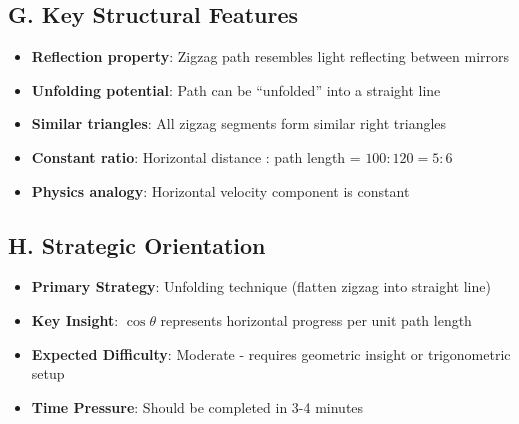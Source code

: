 \documentclass[11pt]{article}
\begin{document}
\begin{problembox}
\subsection*{G. Key Structural Features}
\begin{itemize}[leftmargin=*]
    \item \textbf{Reflection property}: Zigzag path resembles light reflecting between mirrors
    \item \textbf{Unfolding potential}: Path can be ``unfolded'' into a straight line
    \item \textbf{Similar triangles}: All zigzag segments form similar right triangles
    \item \textbf{Constant ratio}: Horizontal distance : path length = $100:120 = 5:6$
    \item \textbf{Physics analogy}: Horizontal velocity component is constant
\end{itemize}

\subsection*{H. Strategic Orientation}
\begin{itemize}[leftmargin=*]
    \item \textbf{Primary Strategy}: Unfolding technique (flatten zigzag into straight line)
    \item \textbf{Key Insight}: $\cos\theta$ represents horizontal progress per unit path length
    \item \textbf{Expected Difficulty}: Moderate - requires geometric insight or trigonometric setup
    \item \textbf{Time Pressure}: Should be completed in 3-4 minutes
\end{itemize}
\end{problembox}
\end{document}
